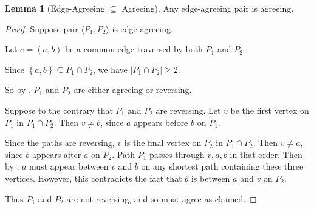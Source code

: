 \documentclass[11pt]{article}
\newcommand{\set}[1]{\left\{#1\right\}}
\theoremstyle{definition}
\newtheorem{lemma}[theorem]{Lemma}
\begin{document}
    \begin{lemma}[Edge-Agreeing $\subseteq$ Agreeing]
        \label{edge-agree}
        Any edge-agreeing pair is agreeing.
    \end{lemma}
    \begin{proof}
        Suppose pair $\langle P_1,P_2\rangle$ is edge-agreeing.
        
        Let $e = (a,b)$ be a common edge traversed  by both $P_1$ and $P_2$.

        Since $\set{a,b}\subseteq P_1\cap P_2$, we have $|P_1\cap P_2|\ge 2$.
        
    So by , $P_1$ and $P_2$ are either agreeing or reversing.

        Suppose to the contrary that $P_1$ and $P_2$ are reversing.
        Let $v$ be the first vertex on $P_1$ in $P_1\cap P_2$.
        Then $v\neq b$, since $a$ appears before $b$ on $P_1$.
        
        Since the paths are reversing, $v$ is the final vertex on $P_2$ in $P_1\cap P_2$.
        Then $v\neq a$, since $b$ appears after $a$ on $P_2$.
        Path $P_1$ passes through $v, a, b$ in that order.
        Then by , $a$ must appear between $v$ and $b$ on any shortest path containing these three vertices.
        However, this contradicts the fact that $b$ is between $a$ and $v$ on $P_2$.

        Thus $P_1$ and $P_2$ are not reversing, and so must agree as claimed.
    \end{proof}
\end{document}
